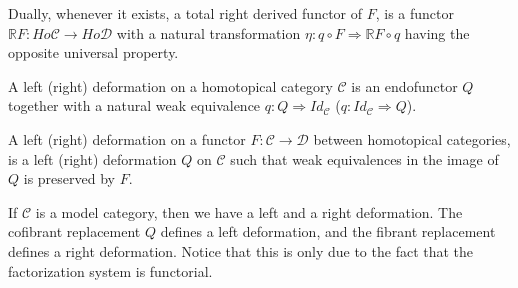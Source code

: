 \documentclass[../thesis.tex]{subfiles}
\begin{document}
\begin{definition}
                Dually, whenever it exists, a total right derived functor of $F$, is a functor $\mathbb{R}F:Ho\mathcal{C}\rightarrow Ho\mathcal{D}$ with a natural transformation $\eta :q\circ F \Rightarrow \mathbb{R}F \circ q$ having the opposite universal property.
                \begin{center}
                    \qquad
                \end{center}
            \end{definition}

            \begin{definition}[Deformation]
                A left (right) deformation on a homotopical category $\mathcal{C}$ is an endofunctor $Q$ together with a natural weak equivalence $q:Q \Rightarrow Id_\mathcal{C}$ ($q:Id_\mathcal{C}\Rightarrow Q$).

                A left (right) deformation on a functor $F:\mathcal{C}\rightarrow\mathcal{D}$ between homotopical categories, is a left (right) deformation $Q$ on $\mathcal{C}$ such that weak equivalences in the image of $Q$ is preserved by $F$.
            \end{definition}

            \begin{remark}
                If $\mathcal{C}$ is a model category, then we have a left and a right deformation. The cofibrant replacement $Q$ defines a left deformation, and the fibrant replacement defines a right deformation. Notice that this is only due to the fact that the factorization system is functorial.
            \end{remark}
\end{document}
